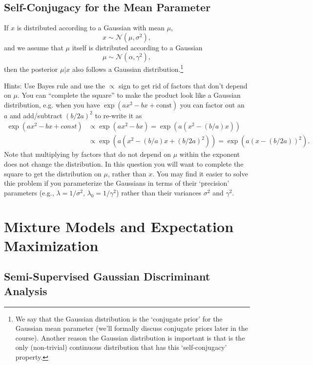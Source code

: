 \documentclass{article}
\begin{document}
\subsection{Self-Conjugacy for the Mean Parameter}

If $x$ is distributed according to a Gaussian with mean $\mu$,
\[
x \sim \mathcal{N}(\mu,\sigma^2),
\]
and we assume that $\mu$ itself is distributed according to a Gaussian
\[
\mu \sim \mathcal{N}(\alpha,\gamma^2),
\]
then the posterior $\mu | x$ also follows a Gaussian distribution.\footnote{We say that the Gaussian distribution is the `conjugate prior' for the Gaussian mean parameter (we'll formally discuss conjugate priors later in the course). Another reason the Gaussian distribution is important is that is the only (non-trivial) continuous distribution that has this `self-conjugacy' property.}  %

Hints: Use Bayes rule and use the $\propto$ sign to get rid of factors that don't depend on $\mu$. You can ``complete the square'' to make the product look like a Gaussian distribution, e.g. when you have $\exp(ax^2 - bx + \text{const})$ you can factor out an $a$ and add/subtract $(b/2a)^2$ to re-write it as
\begin{align*}
\exp\left(ax^2 - bx + const\right) & \propto
\exp\left(ax^2 - bx\right) = \exp\left(a(x^2 - (b/a)x)\right) \\& \propto \exp\left(a(x^2 - (b/a)x + (b/2a)^2)\right) =  \exp\left(a(x - (b/2a))^2\right).
\end{align*}
Note that multiplying by factors that do not depend on $\mu$ within the exponent does not change the distribution. In this question you will want to complete the square to get the distribution on $\mu$, rather than $x$.
You may find it easier to solve thie problem if you parameterize the Gaussians in terms of their `precision' parameters (e.g., $\lambda = 1/\sigma^2$, $\lambda_0 = 1/\gamma^2$) rather than their variances $\sigma^2$ and $\gamma^2$.



\section{Mixture Models and Expectation Maximization}

\subsection{Semi-Supervised Gaussian Discriminant Analysis}
\end{document}
